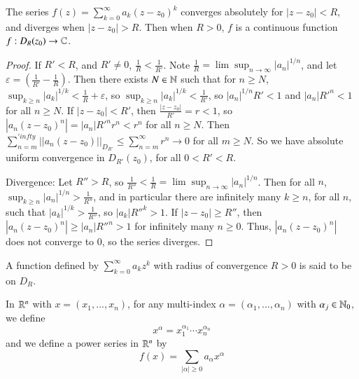 \begin{prop}\label{prop:3.3.3}
    The series $f(z) = \sum_{k=0}^{\infty}a_k(z-z_0)^k$ converges absolutely for $|z-z_0| < R$, and diverges when $|z-z_0| > R$. Then when $R > 0$, $f$ is a continuous function $f:D_R(z_0) \rightarrow \mathbb C$.
\end{prop}
\begin{proof}
    If $R' < R$, and $R' \neq 0$, $\frac{1}{R} < \frac{1}{R'}$. Note $\frac{1}{R} = \lim\sup_{n\rightarrow \infty}|a_n|^{1/n}$, and let $\varepsilon = \left(\frac{1}{R'} - \frac{1}{R}\right)$. Then there exists $N \in \mathbb N$ such that for $n \geq N$, $\sup_{k\geq n}|a_k|^{1/k} < \frac{1}{R}+\varepsilon$, so $\sup_{k\geq n}|a_k|^{1/k} < \frac{1}{R'}$, so $|a_n|^{1/n}R' < 1$ and $|a_n|{R'}^n < 1$ for all $n \geq N$. If $|z-z_0| < R'$, then $\frac{|z-z_0|}{R'} = r < 1$, so $|a_n(z-z_0)^n| = |a_n|{R'}^nr^n < r^n$ for all $n \geq N$. Then $\sum_{n=m}^{'infty}||a_n(z-z_0)||_{D_{R'}} \leq \sum_{n=m}^{\infty}r^n\rightarrow 0$ for all $m \geq N$. So we have absolute uniform convergence in $D_{R'}(z_0)$, for all $0 < R' < R$.

    Divergence: Let $R'' > R$, so $\frac{1}{R''} < \frac{1}{R} = \lim\sup_{n\rightarrow \infty}|a_n|^{1/n}$. Then for all $n$, $\sup_{k\geq n}|a_n|^{1/n} > \frac{1}{R''}$, and in particular there are infinitely many $k \geq n$, for all $n$, such that $|a_k|^{1/k} > \frac{1}{R''}$, so $|a_k|{R''}^k > 1$. If $|z-z_0| \geq R''$, then $|a_n(z-z_0)^n| \geq |a_n|{R''}^n > 1$ for infinitely many $n \geq 0$. Thus, $|a_n(z-z_0)^n|$ does not converge to $0$, so the series diverges.
\end{proof}

\begin{defn}
    A function defined by $\sum_{k=0}^{\infty}a_kz^k$ with radius of convergence $R > 0$ is said to be  on $D_R$.
\end{defn}

\begin{defn}
    In $\mathbb R^n$ with $x = (x_1,...,x_n)$, for any multi-index $\alpha = (\alpha_1,...,\alpha_n)$ with $\alpha_j \in \mathbb N_0$, we define \begin{equation*}
        x^{\alpha} = x_1^{\alpha_1}\cdots x_n^{\alpha_n}
    \end{equation*}
    and we define a power series in $\mathbb R^n$ by \begin{equation*}
        f(x) = \sum_{|\alpha| \geq 0}a_{\alpha}x^{\alpha}
    \end{equation*}
\end{defn}



